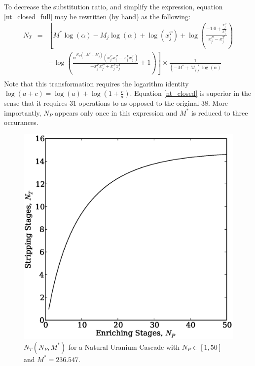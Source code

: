 \documentclass[preprint,12pt]{elsarticle}
\begin{document}
To decrease the substitution ratio, and simplify the expression, equation 
\ref{nt_closed_full} may be rewritten (by hand) as the following:
\begin{equation}
\begin{array}{lcl}
N_T & = & \left[M^{*} \log{\left (\alpha \right )} - M_{j} \log{\left (\alpha \right )} + \log{\left (x^{T}_{j} \right )} + \log{\left (\frac{-1.0 + \frac{x^{P}_{j}}{x^{F}_{j}}}{x^{P}_{j} - x^{T}_{j}} \right )}  \right. \\
& & \left. - \log{\left (\frac{\alpha^{N_{P} \left(- M^{*} + M_{j}\right)} \left(x^{F}_{j} x^{P}_{j} - x^{P}_{j} x^{T}_{j}\right)}{- x^{F}_{j} x^{P}_{j} + x^{F}_{j} x^{T}_{j}} + 1 \right )}\right] \times \frac{1}{\left(- M^{*} + M_{j}\right) \log{\left (\alpha \right )}} \\
\end{array}
\label{nt_closed}
\end{equation}
Note that this transformation requires the logarithm identity 
$\log(a+c) = \log(a) + \log(1 + \frac{c}{a})$.  Equation \ref{nt_closed} is superior
in the sense that it requires 31 operations to as opposed to the original 38.
More importantly, $N_P$ appears only once in this 
expression and $M^*$ is reduced to three occurances.

\begin{figure}[htpb]
\begin{center}
\includegraphics[scale=0.5]{nt_closed.eps}
\caption{$N_T(N_P, M^*)$ for a Natural Uranium Cascade with $N_P\in[1,50]$ and $M^*=236.547$.}
\label{nt_closed_fig}
\end{center}
\end{figure}
\end{document}
